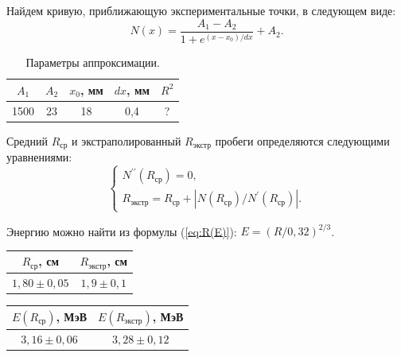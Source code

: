 \documentclass[a4paper,12pt]{article} %
\begin{document}
		Найдем кривую, приближающую экспериментальные точки, в следующем виде:
		\begin{equation*}
			N (x) = \frac{A_1-A_2}{1+e^{(x-x_0)/dx}} + A_2.
		\end{equation*}
	
		\begin{table}[H]
			\caption{Параметры аппроксимации.}
			\label{tab:pfrfmetry1}
			\begin{tabular}{|c|c|c|c|c|}
				\hline
				$A_1$ & $A_2$ & $x_0$, мм & $dx$, мм & $R^2$ \\ \hline
				1500  & 23    & 18        & 0,4      & ?     \\ \hline
			\end{tabular}
		\end{table}
	
		Средний $R_\text{ср}$ и экстраполированный $R_\text{экстр}$ пробеги определяются следующими уравнениями:
		\begin{equation*}
			\begin{cases}
				N^{\prime \prime} (R_\text{ср}) = 0, \\
				R_\text{экстр} = R_\text{ср} + \left|N(R_\text{ср})/N^\prime(R_\text{ср})\right|.
			\end{cases}
		\end{equation*}
	
		Энергию можно найти из формулы (\ref{eq:R(E)}): $E = \left(R/0,32\right)^{2/3}$.
	
			\begin{table}[h!]
			\begin{floatrow}
				{\begin{tabular}{|c|c|}
						\hline
						$R_\text{ср}$, см & $R_\text{экстр}$, см \\ \hline
						$1,80 \pm 0,05 $   & $1,9 \pm 0,1$       \\ \hline
				\end{tabular}}
				{\begin{tabular}{|c|c|}
						\hline
						$E(R_\text{ср})$, МэВ & $E(R_\text{экстр})$, МэВ \\ \hline
						$3,16 \pm 0,06 $     & $3,28 \pm 0,12 $        \\ \hline
				\end{tabular}}        
			\end{floatrow}
		\end{table}
	
\end{document}
